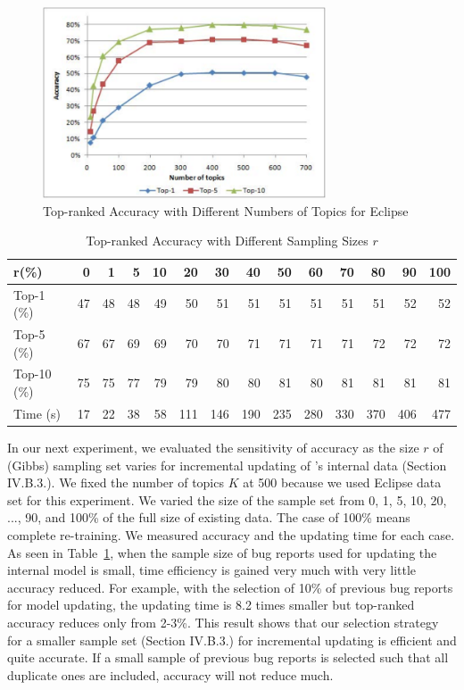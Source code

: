 \begin{figure}[t]
\centering
\includegraphics[width=3.3in]{sensitive}
\caption{Top-ranked Accuracy with Different Numbers of Topics for Eclipse}
\label{sensitive}
\end{figure}


\begin{table}[t]
\centering
\caption{Top-ranked Accuracy with Different Sampling Sizes $r$}
\setlength{\tabcolsep}{2.5pt}
\begin{tabular}{|l||r|r|r|r|r|r|r|r|r|r|r|r|r|}
\hline
   r(\%) & 0 & 1 & 5 & 10 & 20 & 30 & 40 & 50 & 60 & 70 & 80 & 90 & 100\\
\hline
   Top-1 (\%) & 47 & 48 & 48 & 49 & 50 & 51 & 51 & 51 & 51 & 51 & 51 & 52 & 52\\
   Top-5 (\%) & 67 & 67 & 69 & 69 & 70 & 70 & 71 & 71 & 71 & 71 & 72 & 72 & 72\\
   Top-10 (\%) & 75 & 75 & 77 & 79 & 79 & 80 & 80 & 81 & 80 & 81 & 81 & 81 & 81\\
\hline
   Time (s) & 17 & 22 & 38 & 58 & 111 & 146 & 190 & 235 & 280 & 330 & 370 & 406 & 477\\
\hline
\end{tabular}
\label{tradeoff}
\end{table}

In our next experiment, we evaluated the sensitivity of accuracy as
the size $r$ of (Gibbs) sampling set varies for incremental updating of
{\model}'s internal data (Section IV.B.3.). We fixed the number of
topics $K$ at 500 because we used Eclipse data set for this
experiment. We varied the size of the sample set from 0, 1, 5, 10,
20, ..., 90, and 100\% of the full size of existing data. The case of
100\% means complete re-training. We measured accuracy and the
updating time for each case. As seen in Table~\ref{tradeoff}, when the
sample size of bug reports used for updating the internal model is
small, time efficiency is gained very much with very little accuracy
reduced. For example, with the selection of 10\% of previous bug
reports for model updating, the updating time is 8.2 times smaller but
top-ranked accuracy reduces only from 2-3\%. This result shows that
our selection strategy for a smaller sample set (Section IV.B.3.) for
incremental updating is efficient and quite accurate. If a small
sample of previous bug reports is selected such that all duplicate
ones are included, accuracy will not reduce much.


